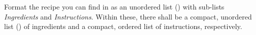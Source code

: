 Format the recipe you can find in  as an 
unordered list () with sub-lists \emph{Ingredients} 
and \emph{Instructions}. 
Within these, there shall be a compact, unordered list 
() of ingredients and a compact, ordered list of 
instructions, respectively.

